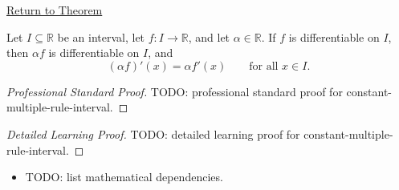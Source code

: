 \newpage
{}
\label{prf:constant-multiple-rule-interval}

\begin{remark*}[Return]
\hyperref[thm:constant-multiple-rule-interval]{Return to Theorem}
\end{remark*}

\begin{theorem*}
Let $I \subseteq \mathbb{R}$ be an interval, let $f : I \to \mathbb{R}$, and let $\alpha \in \mathbb{R}$. If $f$ is differentiable on $I$, then $\alpha f$ is differentiable on $I$, and
\[
(\alpha f)'(x) = \alpha f'(x) \qquad \text{for all } x \in I.
\]
\end{theorem*}

\begin{proof}[Professional Standard Proof]
\LRAProofBodyStart
TODO: professional standard proof for constant-multiple-rule-interval.
\end{proof}

\begin{proof}[Detailed Learning Proof]
\LRAProofBodyStart
TODO: detailed learning proof for constant-multiple-rule-interval.
\end{proof}

\begin{remark*}
\end{remark*}

\begin{dependencies}
\begin{itemize}
  \item TODO: list mathematical dependencies.
\end{itemize}
\end{dependencies}

\clearpage
